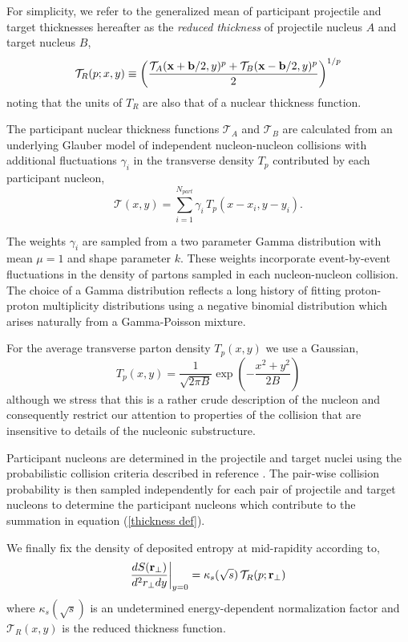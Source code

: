 \documentclass[aps,prl,reprint,amsmath,nofootinbib]{revtex4-1}
\begin{document}
For simplicity, we refer to the generalized mean of participant projectile and target thicknesses hereafter as the \emph{reduced thickness} of projectile 
nucleus $A$ and target nucleus $B$,
\begin{equation}
 \label{reduced}
 \mathcal{T}_R(p;x,y) \equiv \left( \frac{\mathcal{T}_A({\bf x}+{\bf b}/2,y)^p + \mathcal{T}_B({\bf x}-{\bf b}/2,y)^p}{2} \right)^{1/p}
\end{equation}
noting that the units of $T_R$ are also that of a nuclear thickness function. 

The participant nuclear thickness functions $\mathcal{T}_A$ and $\mathcal{T}_B$ are calculated from an underlying Glauber model of independent nucleon-nucleon 
collisions with additional fluctuations $\gamma_i$ in the transverse density $T_p$ contributed by each participant nucleon,
\begin{equation}
 \label{thickness def}
 \mathcal{T}(x,y) = \sum\limits_{i=1}^{N_{part}} \gamma_i\, T_p(x-x_i,y-y_i).
\end{equation}

The weights $\gamma_i$ are sampled from a two parameter Gamma distribution with mean $\mu=1$ and shape parameter $k$. These weights incorporate event-by-event 
fluctuations in the density of partons sampled in each nucleon-nucleon collision. The choice of a Gamma distribution reflects a long history of fitting proton-proton 
multiplicity distributions using a negative binomial distribution which arises naturally from a Gamma-Poisson mixture.

For the average transverse parton density $T_p(x,y)$ we use a Gaussian,
\begin{equation}
 T_p(x,y) = \frac{1}{\sqrt{2 \pi B}} \exp\left(-\frac{x^2+y^2}{2 B}\right) 
\end{equation}
although we stress that this is a rather crude description of the nucleon and consequently restrict our attention to properties of the collision that are 
insensitive to details of the nucleonic substructure.

Participant nucleons are determined in the projectile and target nuclei using the probabilistic collision criteria described in reference \cite{proton-proton}. 
The pair-wise collision probability is then sampled independently for each pair of projectile and target nucleons to determine the 
participant nucleons which contribute to the summation in equation (\ref{thickness def}).

We finally fix the density of deposited entropy at mid-rapidity according to,
\begin{equation}
 \label{entropy deposition}
 \frac{dS({\bf r}_\perp)}{d^2r_\perp dy} \biggr \rvert_{y=0} = \kappa_s(\sqrt{s})\, \mathcal{T}_R(p;{\bf r}_\perp)
\end{equation}
where $\kappa_s(\sqrt{s})$ is an undetermined energy-dependent normalization factor and $\mathcal{T}_R(x,y)$ is the reduced thickness function.
\end{document}
